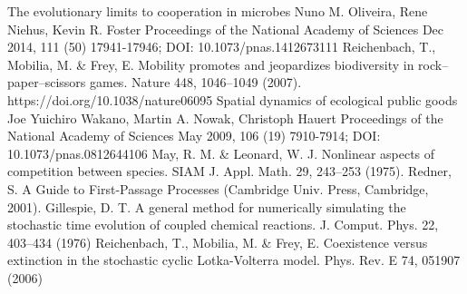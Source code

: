 \documentclass[11pt]{article}
\begin{document}
\newpage
\begin{thebibliography}{}
 The evolutionary limits to cooperation in microbes
Nuno M. Oliveira, Rene Niehus, Kevin R. Foster
Proceedings of the National Academy of Sciences Dec 2014, 111 (50) 17941-17946; DOI: 10.1073/pnas.1412673111 
 Reichenbach, T., Mobilia, M. \& Frey, E. Mobility promotes and jeopardizes biodiversity in rock–paper–scissors games. Nature 448, 1046–1049 (2007). https://doi.org/10.1038/nature06095
 Spatial dynamics of ecological public goods
Joe Yuichiro Wakano, Martin A. Nowak, Christoph Hauert
Proceedings of the National Academy of Sciences May 2009, 106 (19) 7910-7914; DOI: 10.1073/pnas.0812644106
 May, R. M. \& Leonard, W. J. Nonlinear aspects of competition between species.
SIAM J. Appl. Math. 29, 243–253 (1975).
  Redner, S. A Guide to First-Passage Processes (Cambridge Univ. Press, Cambridge,
2001).
 Gillespie, D. T. A general method for numerically simulating the stochastic time
evolution of coupled chemical reactions. J. Comput. Phys. 22, 403–434 (1976)
 Reichenbach, T., Mobilia, M. \& Frey, E. Coexistence versus extinction in the
stochastic cyclic Lotka-Volterra model. Phys. Rev. E 74, 051907 (2006) 
\end{thebibliography}
\end{document}
